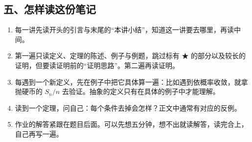 \subsection*{五、怎样读这份笔记}

\begin{enumerate}
\item 每一讲先读开头的引言与末尾的“本讲小结”，知道这一讲要去哪里，再读中间。
\item 第一遍只读定义、定理的陈述、例子与例题，跳过标有 ★ 的部分以及较长的证明，但要读证明前的“证明思路”。第二遍再读证明。
\item 每遇到一个新定义，先在例子中把它具体算一遍：比如遇到依概率收敛，就拿抛硬币的 $S_n/n$ 去验证。抽象的定义只有在具体的例子中才能理解。
\item 读到一个定理，问自己：每个条件去掉会怎样？正文中通常有对应的反例。
\item 作业的解答紧跟在题目后面。可以先想五分钟，想不出就读解答，读完合上，自己再写一遍。
\end{enumerate}
